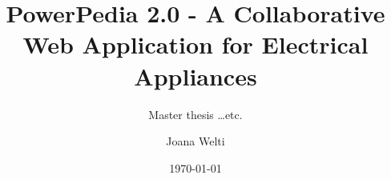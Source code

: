 \documentclass[fontsize=11pt,paper=a4]{scrartcl}
\begin{document}
\title{PowerPedia 2.0 - A Collaborative Web Application for Electrical Appliances}
\subtitle{Master thesis \dots etc.}
\date{\today}
\author{Joana Welti}
\maketitle

\tableofcontents











{}

\end{document}
